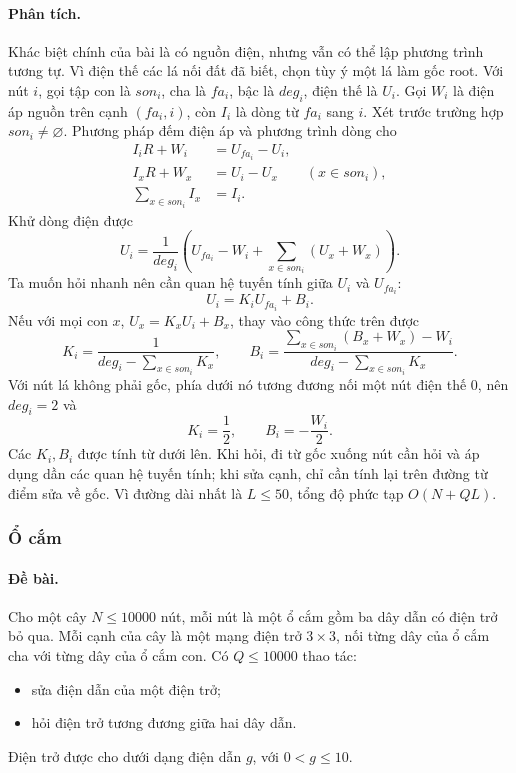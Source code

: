 \documentclass[11pt]{article}
\begin{document}
\paragraph{Phân tích.}
Khác biệt chính của bài là có nguồn điện, nhưng vẫn có thể lập phương trình
tương tự. Vì điện thế các lá nối đất đã biết, chọn tùy ý một lá làm gốc
\(\mathrm{root}\). Với nút \(i\), gọi tập con là \(son_i\), cha là \(fa_i\), bậc
là \(deg_i\), điện thế là \(U_i\). Gọi \(W_i\) là điện áp nguồn trên cạnh
\((fa_i,i)\), còn \(I_i\) là dòng từ \(fa_i\) sang \(i\). Xét trước trường hợp
\(son_i\ne\varnothing\). Phương pháp đếm điện áp và phương trình dòng cho
\[
\begin{aligned}
  I_iR+W_i &= U_{fa_i}-U_i,\\
  I_xR+W_x &= U_i-U_x \qquad (x\in son_i),\\
  \sum_{x\in son_i} I_x &= I_i.
\end{aligned}
\]
Khử dòng điện được
\[
  U_i=\frac{1}{deg_i}\left(U_{fa_i}-W_i+
    \sum_{x\in son_i}(U_x+W_x)\right).
\]
Ta muốn hỏi nhanh nên cần quan hệ tuyến tính giữa \(U_i\) và \(U_{fa_i}\):
\[
  U_i=K_iU_{fa_i}+B_i.
\]
Nếu với mọi con \(x\), \(U_x=K_xU_i+B_x\), thay vào công thức trên được
\[
  K_i=\frac{1}{deg_i-\sum_{x\in son_i}K_x},
  \qquad
  B_i=\frac{\sum_{x\in son_i}(B_x+W_x)-W_i}
           {deg_i-\sum_{x\in son_i}K_x}.
\]
Với nút lá không phải gốc, phía dưới nó tương đương nối một nút điện thế \(0\),
nên \(deg_i=2\) và
\[
  K_i=\frac12,\qquad B_i=-\frac{W_i}{2}.
\]
Các \(K_i,B_i\) được tính từ dưới lên. Khi hỏi, đi từ gốc xuống nút cần hỏi và
áp dụng dần các quan hệ tuyến tính; khi sửa cạnh, chỉ cần tính lại trên đường
từ điểm sửa về gốc. Vì đường dài nhất là \(L\le 50\), tổng độ phức tạp
\(O(N+QL)\).

\subsubsection{Ổ cắm}

\paragraph{Đề bài.}
Cho một cây \(N\le 10000\) nút, mỗi nút là một ổ cắm gồm ba dây dẫn có điện trở
bỏ qua. Mỗi cạnh của cây là một mạng điện trở \(3\times 3\), nối từng dây của
ổ cắm cha với từng dây của ổ cắm con. Có \(Q\le 10000\) thao tác:
\begin{itemize}
  \item sửa điện dẫn của một điện trở;
  \item hỏi điện trở tương đương giữa hai dây dẫn.
\end{itemize}
Điện trở được cho dưới dạng điện dẫn \(g\), với \(0<g\le 10\).
\end{document}
